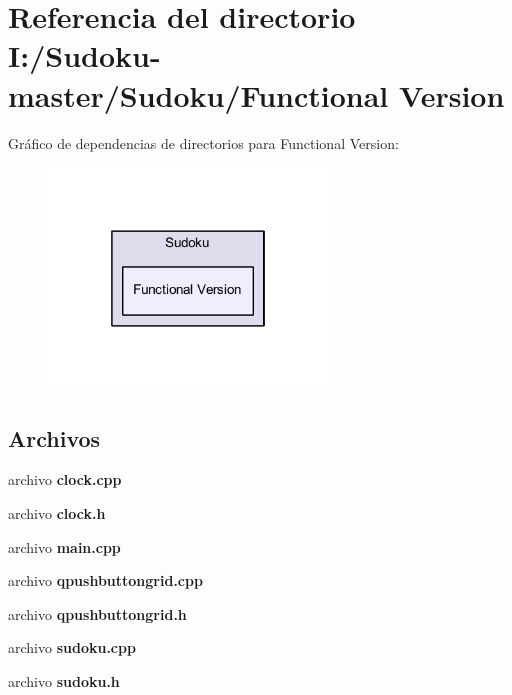 \section{Referencia del directorio I\-:/\-Sudoku-\/master/\-Sudoku/\-Functional Version}
\label{dir_6e98f717987fbaa80058d5737c3e900d}
Gráfico de dependencias de directorios para Functional Version\-:
\nopagebreak
\begin{figure}[H]
\begin{center}
\leavevmode
\includegraphics[width=210pt]{dir_6e98f717987fbaa80058d5737c3e900d_dep}
\end{center}
\end{figure}
\subsection*{Archivos}
\begin{DoxyCompactItemize}
\item 
archivo {\bf clock.\-cpp}
\item 
archivo {\bf clock.\-h}
\item 
archivo {\bf main.\-cpp}
\item 
archivo {\bf qpushbuttongrid.\-cpp}
\item 
archivo {\bf qpushbuttongrid.\-h}
\item 
archivo {\bf sudoku.\-cpp}
\item 
archivo {\bf sudoku.\-h}
\end{DoxyCompactItemize}
